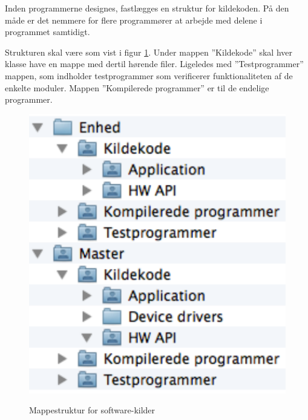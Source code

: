 
Inden programmerne designes, fastlægges en struktur for kildekoden. På den måde er det nemmere for flere programmører at arbejde med delene i programmet samtidigt.

Strukturen skal være som vist i figur \ref{fig:implementationview}. Under mappen ''Kildekode'' skal hver klasse have en mappe med dertil hørende filer. Ligeledes med ''Testprogrammer'' mappen, som indholder testprogrammer som verificerer funktionaliteten af de enkelte moduler.
Mappen ''Kompilerede programmer'' er til de endelige programmer.

\begin{figure}[htbp] \centering
{\includegraphics[scale=0.7]{filer/pics/SW-Implementation-View}}
\caption{Mappestruktur for software-kilder}
\label{fig:implementationview}
\end{figure}